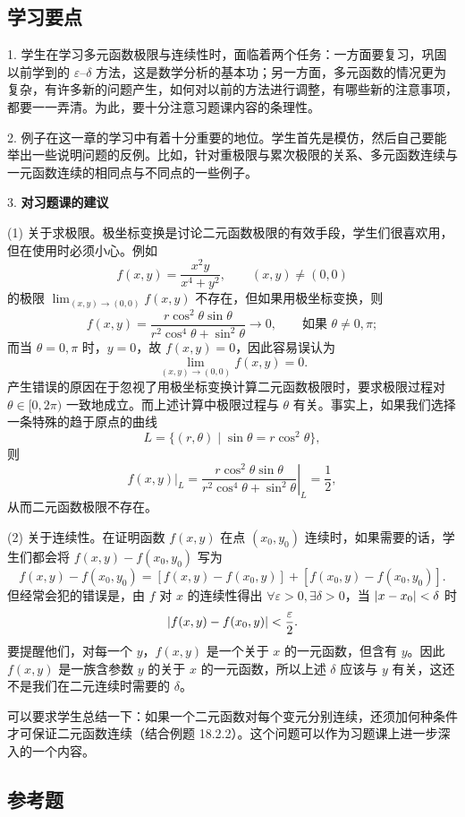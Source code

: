 \subsection{学习要点}

1. 学生在学习多元函数极限与连续性时，面临着两个任务：一方面要复习，巩固以前学到的 $\varepsilon$--$\delta$ 方法，这是数学分析的基本功；另一方面，多元函数的情况更为复杂，有许多新的问题产生，如何对以前的方法进行调整，有哪些新的注意事项，都要一一弄清。为此，要十分注意习题课内容的条理性。

2. 例子在这一章的学习中有着十分重要的地位。学生首先是模仿，然后自己要能举出一些说明问题的反例。比如，针对重极限与累次极限的关系、多元函数连续与一元函数连续的相同点与不同点的一些例子。

3. \textbf{对习题课的建议}

(1) 关于求极限。极坐标变换是讨论二元函数极限的有效手段，学生们很喜欢用，但在使用时必须小心。例如
\[
  f(x,y)=\frac{x^2y}{x^4+y^2},\qquad (x,y)\ne(0,0)
\]
的极限 $\displaystyle\lim_{(x,y)\to(0,0)}f(x,y)$ 不存在，但如果用极坐标变换，则
\[
  f(x,y)=\frac{r\cos^2\theta\sin\theta}{r^2\cos^4\theta+\sin^2\theta}\to0,
  \qquad \text{如果 }\theta\ne0,\pi;
\]
而当 $\theta=0,\pi$ 时，$y=0$，故 $f(x,y)=0$，因此容易误认为
\[
  \lim_{(x,y)\to(0,0)}f(x,y)=0.
\]
产生错误的原因在于忽视了用极坐标变换计算二元函数极限时，要求极限过程对 $\theta\in[0,2\pi)$ 一致地成立。而上述计算中极限过程与 $\theta$ 有关。事实上，如果我们选择一条特殊的趋于原点的曲线
\[
  L=\{(r,\theta)\mid\sin\theta=r\cos^2\theta\},
\]
则
\[
  f(x,y)\big|_L
  =\left.\frac{r\cos^2\theta\sin\theta}{r^2\cos^4\theta+\sin^2\theta}\right|_L
  =\frac12,
\]
从而二元函数极限不存在。

(2) 关于连续性。在证明函数 $f(x,y)$ 在点 $(x_0,y_0)$ 连续时，如果需要的话，学生们都会将 $f(x,y)-f(x_0,y_0)$ 写为
\[
  f(x,y)-f(x_0,y_0)
  =[f(x,y)-f(x_0,y)]+[f(x_0,y)-f(x_0,y_0)].
\]
但经常会犯的错误是，由 $f$ 对 $x$ 的连续性得出 $\forall\varepsilon>0,\exists\delta>0$，当 $\lvert x-x_0\rvert<\delta$ 时
\[
  \lvert f(x,y)-f(x_0,y)\rvert<\frac\varepsilon2.
\]
要提醒他们，对每一个 $y$，$f(x,y)$ 是一个关于 $x$ 的一元函数，但含有 $y$。因此 $f(x,y)$ 是一族含参数 $y$ 的关于 $x$ 的一元函数，所以上述 $\delta$ 应该与 $y$ 有关，这还不是我们在二元连续时需要的 $\delta$。

可以要求学生总结一下：如果一个二元函数对每个变元分别连续，还须加何种条件才可保证二元函数连续（结合例题 18.2.2）。这个问题可以作为习题课上进一步深入的一个内容。

\subsection{参考题}

